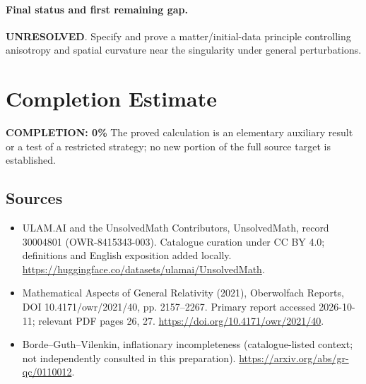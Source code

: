 \documentclass[11pt]{article}
\begin{document}
\paragraph{Final status and first remaining gap.}
\textbf{UNRESOLVED}. Specify and prove a matter/initial-data principle controlling anisotropy and spatial curvature near the singularity under general perturbations.

\section{Completion Estimate}
\noindent\textbf{COMPLETION: 0\%}
The proved calculation is an elementary auxiliary result or a test of a restricted strategy; no new portion of the full source target is established.

\subsection{Sources}
\begin{itemize}
\item[\hypertarget{source:30004801:1}{S1}] ULAM.AI and the UnsolvedMath Contributors, UnsolvedMath, record 30004801 (OWR-8415343-003). Catalogue curation under CC BY 4.0; definitions and English exposition added locally.
\url{https://huggingface.co/datasets/ulamai/UnsolvedMath}.
\item[\hypertarget{source:30004801:2}{S2}] Mathematical Aspects of General Relativity (2021), Oberwolfach Reports, DOI 10.4171/owr/2021/40, pp. 2157--2267. Primary report accessed 2026-10-11; relevant PDF pages 26, 27.
\url{https://doi.org/10.4171/owr/2021/40}.
\item[\hypertarget{source:30004801:3}{S3}] Borde--Guth--Vilenkin, inflationary incompleteness (catalogue-listed context; not independently consulted in this preparation).
\url{https://arxiv.org/abs/gr-qc/0110012}.
\end{itemize}
\label{end:30004801}
\end{document}
